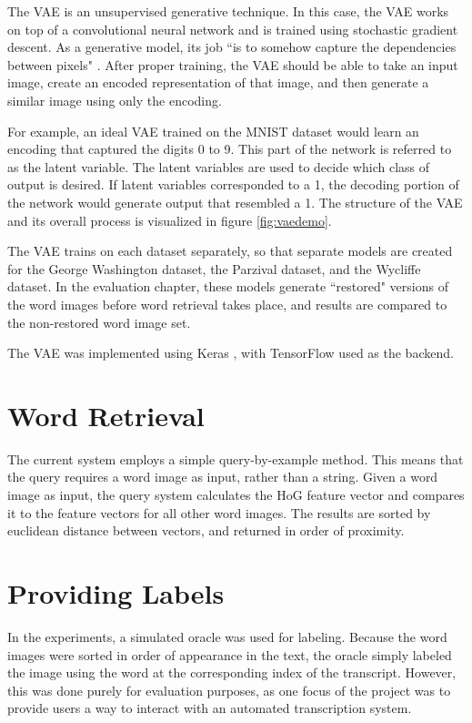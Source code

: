 \documentclass[final]{ukthesis}
\begin{document}
The VAE is an unsupervised generative technique. In this case, the VAE works on top of a convolutional neural network and is trained using stochastic gradient descent. As a generative model, its job ``is to somehow capture the dependencies between pixels" \cite{doersch2016tutorial}. After proper training, the VAE should be able to take an input image, create an encoded representation of that image, and then generate a similar image using only the encoding.

For example, an ideal VAE trained on the MNIST dataset would learn an encoding that captured the digits 0 to 9. This part of the network is referred to as the latent variable. The latent variables are used to decide which class of output is desired. If latent variables corresponded to a 1, the decoding portion of the network would generate output that resembled a 1. The structure of the VAE and its overall process is visualized in figure \ref{fig:vaedemo}.

The VAE trains on each dataset separately, so that separate models are created for the George Washington dataset, the Parzival dataset, and the Wycliffe dataset. In the evaluation chapter, these models generate ``restored" versions of the word images before word retrieval takes place, and results are compared to the non-restored word image set.

The VAE was implemented using Keras \cite{chollet2015keras}, with TensorFlow \cite{abadi2016tensorflow} used as the backend.


%
%
\section{Word Retrieval}
The current system employs a simple query-by-example method. This means that the query requires a word image as input, rather than a string. Given a word image as input, the query system calculates the HoG feature vector and compares it to the feature vectors for all other word images. The results are sorted by euclidean distance between vectors, and returned in order of proximity.



%
%
\section{Providing Labels}
In the experiments, a simulated oracle was used for labeling. Because the word images were sorted in order of appearance in the text, the oracle simply labeled the image using the word at the corresponding index of the transcript. However, this was done purely for evaluation purposes, as one focus of the project was to provide users a way to interact with an automated transcription system.
\end{document}
